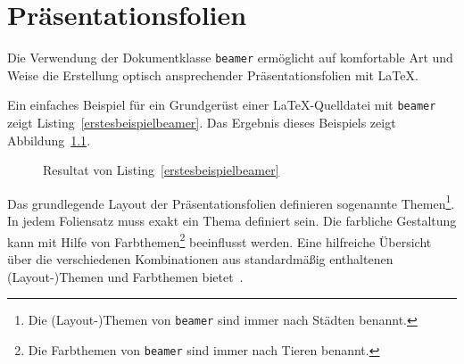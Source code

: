 \documentclass[a4paper,10pt,twoside]{scrbook}
\begin{document}



	
















\chapter{Präsentationsfolien}
\label{Kapitel_Praesentationsfolien}

Die Verwendung der Dokumentklasse \verb!beamer! ermöglicht auf komfortable Art und Weise die Erstellung optisch ansprechender Präsentationsfolien mit \LaTeX. 


Ein einfaches Beispiel für ein Grundgerüst einer \LaTeX-Quelldatei mit \verb|beamer| zeigt Listing~\ref{erstesbeispielbeamer}. Das Ergebnis dieses Beispiels zeigt Abbildung~\ref{fig_erstesbeispielbeamer}.





\begin{figure}[H]
	\caption{Resultat von Listing~\ref{erstesbeispielbeamer}}
	\label{fig_erstesbeispielbeamer}
\end{figure}



Das grundlegende Layout der Präsentationsfolien definieren sogenannte Themen\footnote{Die (Layout-)Themen von \texttt{beamer} sind immer nach Städten benannt.}. In jedem Foliensatz muss exakt ein Thema definiert sein. 
Die farbliche Gestaltung kann mit Hilfe von Farbthemen\footnote{Die Farbthemen von \texttt{beamer} sind immer nach Tieren benannt.} beeinflusst werden. Eine hilfreiche Übersicht über die verschiedenen Kombinationen aus standardmäßig enthaltenen (Layout-)Themen und Farbthemen bietet~\cite{BeamerThemeMatrixWebseite}. 
\end{document}
